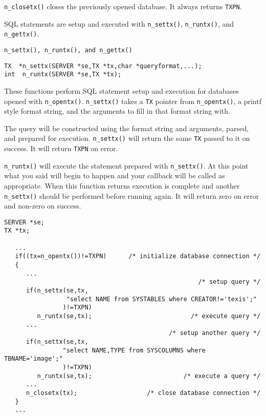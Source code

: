 \verb`n_closetx()` closes the previously opened database.  It always
returns \verb`TXPN`.

SQL statements are setup and executed with \verb`n_settx()`,
\verb`n_runtx()`, and \verb`n_gettx()`.

\SEE
\begin{verbatim}
n_settx(), n_runtx(), and n_gettx()
\end{verbatim}


\SYNOPSIS
\begin{verbatim}
TX  *n_settx(SERVER *se,TX *tx,char *queryformat,...);
int  n_runtx(SERVER *se,TX *tx);
\end{verbatim}

\DESCRIPTION

These functions perform SQL statement setup and execution for databases
opened with \verb`n_opentx()`. \verb`n_settx()` takes a \verb`TX` pointer
from \verb`n_opentx()`, a printf style format string, and the arguments
to fill in that format string with.

The query will be constructed using the format string and arguments,
parsed, and prepared for execution.  \verb`n_settx()` will return the
same \verb`TX` passed to it on success.  It will return \verb`TXPN` on
error.

\verb`n_runtx()` will execute the statement prepared with
\verb`n_settx()`.  At this point what you said will begin to happen and
your callback will be called as appropriate.  When this function returns
execution is complete and another \verb`n_settx()` should be performed
before running again.  It will return zero on error and non-zero on
success.

\EXAMPLE
\begin{verbatim}
SERVER *se;
TX *tx;

   ...
   if((tx=n_opentx())!=TXPN)      /* initialize database connection */
   {
      ...
                                                     /* setup query */
      if(n_settx(se,tx,
                 "select NAME from SYSTABLES where CREATOR!='texis';"
                )!=TXPN)
         n_runtx(se,tx);                           /* execute query */
      ...
                                             /* setup another query */
      if(n_settx(se,tx,
                "select NAME,TYPE from SYSCOLUMNS where TBNAME='image';"
                )!=TXPN)
         n_runtx(se,tx);                         /* execute a query */
      ...
      n_closetx(tx);                   /* close database connection */
   }
   ...
\end{verbatim}

